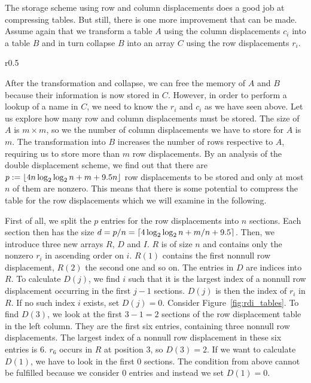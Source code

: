The storage scheme using row and column displacements does a good job at compressing tables.
But still, there is one more improvement that can be made.
Assume again that we transform a table $A$ using the column displacements $c_i$ into a table $B$ and in turn collapse $B$ into an array $C$ using the row displacements $r_i$.
%
\begin{wrapfigure}{r}{0.5\textwidth}
	\centering
	
	\caption{\small Row displacement directory for $p = 12, n = 4$, $d = 3$ with the arrays $R, D$ and $I$. $D$ indexes into $R$, $I$ contains offsets for the indices in $D$. \label{fig:rdi_tables}}
\end{wrapfigure}
%
After the transformation and collapse, we can free the memory of $A$ and $B$ because their information is now stored in $C$.
However, in order to perform a lookup of a name in $C$, we need to know the $r_i$ and $c_i$ as we have seen above.
Let us explore how many row and column displacements must be stored.
The size of $A$ is $m \times m$, so we the number of column displacements we have to store for $A$ is $m$.
The transformation into $B$ increases the number of rows respective to $A$, requiring us to store more than $m$ row displacements.
By an analysis of the double displacement scheme, we find out that there are
$p := \left\lfloor 4 n \log_2 \log_2 n + m + 9.5 n \right\rfloor$ row displacements to be stored and only at most $n$ of them are nonzero.
This means that there is some potential to compress the table for the row displacements which we will examine in the following.

First of all, we split the $p$ entries for the row displacements into $n$ sections.
Each section then has the size $d = p/n = \left\lceil 4 \log_2 \log_2 n + m/n + 9.5 \right\rceil$.
Then, we introduce three new arrays $R$, $D$ and $I$.
$R$ is of size $n$ and contains only the nonzero $r_i$ in ascending order on $i$.
$R(1)$ contains the first nonnull row displacement, $R(2)$ the second one and so on.
The entries in $D$ are indices into $R$.
To calculate $D(j)$, we find $i$ such that it is the largest index of a nonnull row displacement occurring in the first $j - 1$ sections.
$D(j)$ is then the index of $r_i$ in $R$.
If no such index $i$ exists, set $D(j) = 0$.
Consider Figure~\ref{fig:rdi_tables}.
To find $D(3)$, we look at the first $3 - 1 = 2$ sections of the row displacement table in the left column.
They are the first six entries, containing three nonnull row displacements.
The largest index of a nonnull row displacement in these six entries is $6$.
$r_6$ occurs in $R$ at position $3$, so $D(3) = 2$.
If we want to calculate $D(1)$, we have to look in the first $0$ sections.
The condition from above cannot be fulfilled because we consider 0 entries and instead we set $D(1) = 0$.

